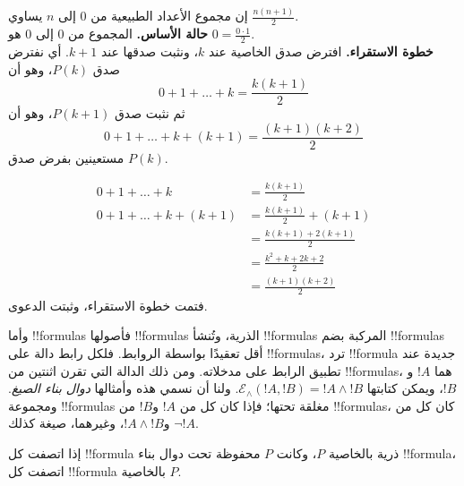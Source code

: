 \documentclass[../../../include/open-logic-section]{subfiles}
\begin{document}
\begin{ex} إن مجموع الأعداد الطبيعية من $0$ إلى $n$ يساوي $\frac{n(n+1)}{2}$. \\

\textbf{حالة الأساس.} المجموع من $0$ إلى $0$ هو $0=
\frac{0\cdot 1}{2}$.\\

\textbf{خطوة الاستقراء.} افترض صدق الخاصية عند $k$، ونثبت صدقها عند
$k+1$. أي نفترض صدق $P(k)$، وهو أن
\[ 0 + 1 + \ldots + k = \frac{k(k+1)}{2} \]
ثم نثبت صدق $P(k+1)$، وهو أن
\[ 0 + 1 + \ldots + k + (k+1) = \frac{(k+1)(k+2)}{2} \]
مستعينين بفرض صدق $P(k)$.

\begin{align*}
0 + 1 + \ldots + k &= \frac{k(k+1)}{2} \tag{فرض الاستقراء} \\
0 + 1 + \ldots + k + (k+1) &= \frac{k(k+1)}{2} + (k+1)
\tag{إضافة $k+1$ إلى الطرفين} \\
&= \frac{k(k+1) + 2(k+1)}{2} \\
&= \frac{k^2 + k + 2k +2}{2} \\
&=\frac{(k+1)(k+2)}{2}
\end{align*}
فتمت خطوة الاستقراء، وثبتت الدعوى.
\end{ex}

\begin{explain}
وأما !!{formula}s فأصولها !!{formula}s الذرية، وتُنشأ !!{formula}s المركبة
بضم !!{formula}s أقل تعقيدًا بواسطة الروابط. فلكل رابط دالة على
!!{formula}s، ترد !!{formula} جديدة عند تطبيق الرابط على مدخلاته. ومن
ذلك الدالة التي تقرن اثنتين من !!{formula}s، هما $!A$ و$!B$، ويمكن كتابتها
$\mathcal E _\land (!A, !B) = !A \land !B$. ولنا أن نسمي هذه وأمثالها
\emph{دوال بناء الصيغ}. ومجموعة !!{formula}s مغلقة تحتها؛ فإذا كان كل من
$!A$ و$!B$ من !!{formula}s، كان كل من $\lnot !A$ و$!A \land !B$،
وغيرهما، صيغة كذلك.
\end{explain}

\begin{defn}
إذا اتصفت كل !!{formula} ذرية بالخاصية $P$، وكانت $P$ محفوظة تحت دوال
بناء !!{formula}، اتصفت كل !!{formula} بالخاصية $P$.
\end{defn}
\end{document}
